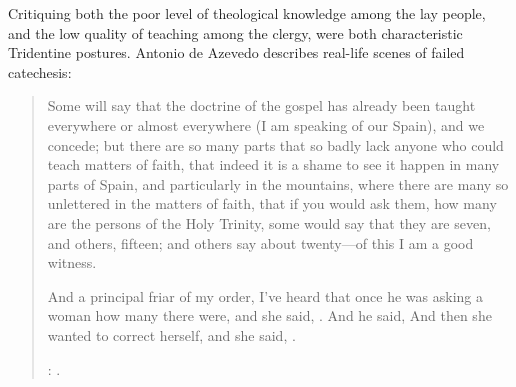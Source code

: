 Critiquing both the poor level of theological knowledge among the lay people, and the low quality of teaching among the clergy, were both characteristic Tridentine postures.
Antonio de Azevedo describes real-life scenes of failed catechesis:
\begin{quotation}
    Some will say that the doctrine of the gospel has already been taught everywhere or almost everywhere (I am speaking of our Spain), and we concede;
    but there are so many parts that so badly lack anyone who could teach matters of faith,
    that indeed it is a shame to see it happen in many parts of Spain, and particularly in the  mountains,
    where there are many so unlettered  in the matters of faith,
    that if you would ask them, how many are the persons of the Holy Trinity, some would say that they are seven, and others, fifteen; and others say about twenty---of this I am a good witness.

    And a principal friar of my order, I've heard that once he was asking a woman how many  there were, and she said, .
    And he said, 
    And then she wanted to correct herself, and she said, .%
    \begin{Footnote}
        \Autocite[26]{Azevedo:Catecismo}:
        .
    \end{Footnote}
\end{quotation}

